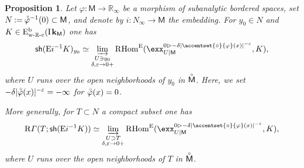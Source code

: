 \documentclass[JEP,XML,SOM,Unicode]{cedram}
\theoremstyle{plain}
\newtheorem{proposition}[theorem]{Proposition}
\theoremstyle{definition}
\newcommand{\R}{\mathbb{R}}
\newcommand{\bR}{{\R_\infty}}
\newcommand{\derived}[1]{\mathrm{#1}}
\newcommand{\dere}{\derived{E}}\let\enh\dere
\newcommand{\derr}{\derived{R}}
\newcommand{\BECwRc}[2][\ifield]{\dere^{\mathrm{b}}_\wRc(#1_{#2})}
\newcommand{\RHom}[1][]{\derr\mathrm{Hom}_{\raise1.5ex\hbox to.1em{}#1}}
\newcommand{\FHom}{\RHom^\enh}
\newcommand{\Eopb}[1]{\enh#1^{-1}}
\newcommand{\wRc}{{\mathrm{w}\text-\R\text-\mathrm{c}}}
\newcommand{\field}{\mathbf{k}}\let\cor\field
\newcommand{\ind}{\mathrm{I}\mspace{2mu}}
\newcommand{\ifield}{\ind\field}
\newcommand{\unbordered}[1]{{\accentset{\circ}{#1}}}
\let\oo \unbordered
\newcommand{\inbordered}[1]{{#1_\infty}}
\newcommand{\range}[2]{#1 \mathbin{\rhd} #2}
\newcommand{\rsect}{\derr\varGamma}
\newcommand{\sh}{\mathsf{sh}}
\newcommand{\bbM}{\mathsf{M}}
\newcommand{\obM}{\unbordered{\bbM}}
\newcommand{\bN}{\inbordered{N}}
\newcommand{\defeq}{\mathbin{:=}}\let \seteq\defeq
\newcommand{\ilim}[1][]{\mathop{\varinjlim}\limits_{#1}}
\begin{document}
\begin{proposition}\label{pro:sgerm}
Let $\varphi\colon \bbM\to \bR$ be a morphism of subanalytic bordered spaces, set
$N \defeq \oo\varphi{}^{-1}(0)\subset\bbM$, and denote by $i\colon \bN\to \bbM$ the embedding.
For $y_0\in N$ and $K\in\BECwRc \bbM$ one has
\[
\sh(\Eopb i K)_{y_0} \simeq
\ilim[\substack{U\owns y_0\\\delta,\varepsilon\to0+}]\FHom(\exx^{\range0{-\delta|\oo\varphi(x)|^{-\varepsilon}}}_{U|\bbM},K),
\]
where $U$ runs over the open neighborhoods of $y_0$ in $\obM$.
Here, we set $-\delta|\oo\varphi(x)|^{-\varepsilon}=-\infty$ for $\oo\varphi(x)=0$.

More generally, for $T\subset N$ a compact subset one has
\begin{equation}
\label{eq:sectT}
\rsect(T;\sh(\Eopb i K)) \simeq
\ilim[\substack{U\supset T\\\delta,\varepsilon\to0+}]\FHom(\exx^{\range0{-\delta|\oo\varphi(x)|^{-\varepsilon}}}_{U|\bbM},K),
\end{equation}
where $U$ runs over the open neighborhoods of $T$ in $\obM$.
\end{proposition}
\end{document}

